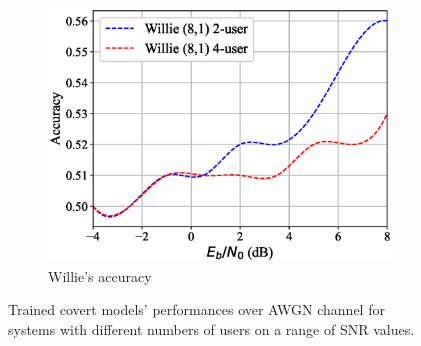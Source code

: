 \begin{figure}[tp!]
\begin{subfigure}{0.3\textwidth}
		\includegraphics[width=\linewidth]{figs/multi_willie_accuracy_awgn}
		\caption{Willie's accuracy}	
		\label{fig:multi_awgn_resutls_willie}
	\end{subfigure}
	\caption{Trained covert models' performances over AWGN channel for systems with different numbers of users on a range of SNR values.}
	\label{fig:multi_awgn_results}
\end{figure}
